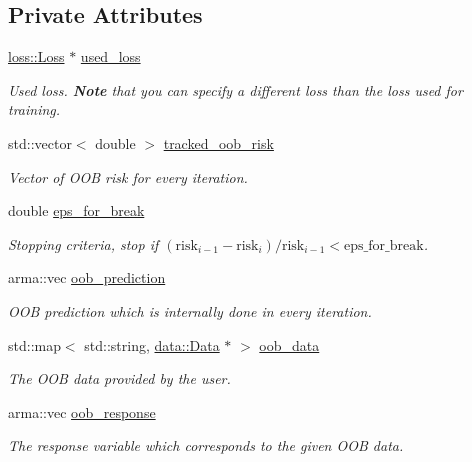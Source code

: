 \subsection*{Private Attributes}
\begin{DoxyCompactItemize}
\item 
\hyperlink{classloss_1_1_loss}{loss\+::\+Loss} $\ast$ \hyperlink{classlogger_1_1_logger_oob_risk_af889f26216d86721dcab4fb0823ac525}{used\+\_\+loss}
\begin{DoxyCompactList}\small\item\em Used loss. {\bfseries Note} that you can specify a different loss than the loss used for training. \end{DoxyCompactList}\item 
std\+::vector$<$ double $>$ \hyperlink{classlogger_1_1_logger_oob_risk_abdc2e187dc393056b2986882dbb5b03f}{tracked\+\_\+oob\+\_\+risk}
\begin{DoxyCompactList}\small\item\em Vector of O\+OB risk for every iteration. \end{DoxyCompactList}\item 
double \hyperlink{classlogger_1_1_logger_oob_risk_ac4c642d6e83bfa16cc5c6026a1238f58}{eps\+\_\+for\+\_\+break}
\begin{DoxyCompactList}\small\item\em Stopping criteria, stop if $(\mathrm{risk}_{i-1} - \mathrm{risk}_i) / \mathrm{risk}_{i-1} < \mathrm{eps\_for\_break}$. \end{DoxyCompactList}\item 
arma\+::vec \hyperlink{classlogger_1_1_logger_oob_risk_a73c43ce74fa5cee78c00b1179bf84c58}{oob\+\_\+prediction}
\begin{DoxyCompactList}\small\item\em O\+OB prediction which is internally done in every iteration. \end{DoxyCompactList}\item 
std\+::map$<$ std\+::string, \hyperlink{classdata_1_1_data}{data\+::\+Data} $\ast$ $>$ \hyperlink{classlogger_1_1_logger_oob_risk_aad747d3aff49f9df9604cdd82bdb914b}{oob\+\_\+data}
\begin{DoxyCompactList}\small\item\em The O\+OB data provided by the user. \end{DoxyCompactList}\item 
arma\+::vec \hyperlink{classlogger_1_1_logger_oob_risk_a55a0c205b53d67467bf020547355c0a6}{oob\+\_\+response}
\begin{DoxyCompactList}\small\item\em The response variable which corresponds to the given O\+OB data. \end{DoxyCompactList}\end{DoxyCompactItemize}
